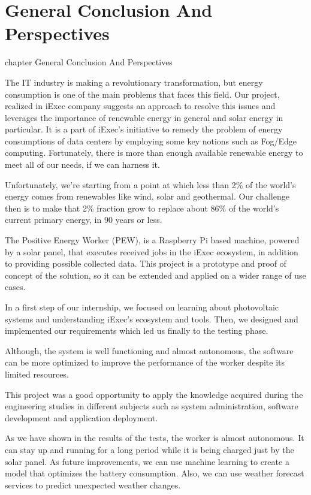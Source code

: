 

\chapter*{General Conclusion And Perspectives}
 {chapter} {General Conclusion And Perspectives}

The IT industry is making a revolutionary transformation, but energy consumption is one of the main problems
that faces this field. Our project, realized in iExec company suggests an approach to resolve this issues and
leverages the importance of renewable energy in general and solar energy in particular. It is a part of
iExec's initiative to remedy the problem of energy consumptions of data centers by employing some key notions
such as Fog/Edge computing. Fortunately, there is more than enough available renewable energy to meet all of
our needs, if we can harness it.

Unfortunately, we're starting from a point at which less than 2\% of the world's energy comes
from renewables like wind, solar and geothermal. Our challenge then is to make that 2\% fraction grow to
replace about 86\% of the world's current primary energy, in 90 years or less.

The Positive Energy Worker (PEW), is a Raspberry Pi based machine, powered by a solar panel, that executes
received jobs in the iExec ecosystem, in addition to providing possible collected data. This project is
a prototype and proof of concept of the solution, so it can be extended and applied on a wider range of
use cases.

In a first step of our internship, we focused on learning about photovoltaic systems and understanding iExec's
ecosystem and tools. Then, we designed and implemented our requirements which led us finally to the testing
phase.

Although, the system is well functioning and almost autonomous, the software can be more optimized to improve
the performance of the worker despite its limited resources.

This project was a good opportunity to apply the knowledge acquired during the engineering studies in different
subjects such as system administration, software development and application deployment.

As we have shown in the results of the tests, the worker is almost autonomous. It can stay up and running for
a long period while it is being charged just by the solar panel. As future improvements, we can use machine
learning to create a model that optimizes the battery consumption. Also, we can use weather forecast services
to predict unexpected weather changes. 